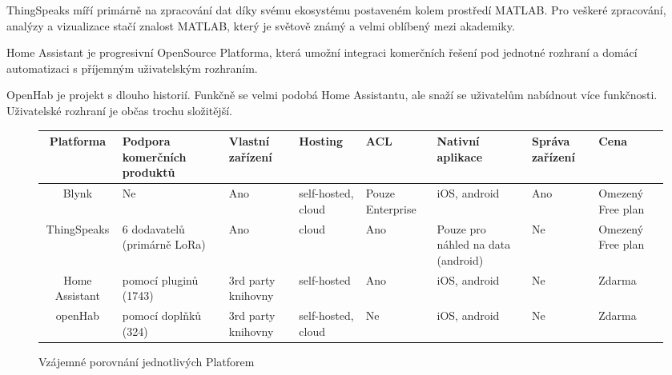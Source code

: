 ThingSpeaks míří primárně na zpracování dat díky svému ekosystému postaveném kolem prostředí MATLAB. Pro veškeré zpracování, analýzy a vizualizace stačí znalost MATLAB, který je světově známý a velmi oblíbený mezi akademiky.

Home Assistant je progresivní OpenSource Platforma, která umožní integraci komerčních řešení pod jednotné rozhraní a domácí automatizaci s příjemným uživatelským rozhraním.

OpenHab je projekt s dlouho historií. Funkčně se velmi podobá Home Assistantu, ale snaží se uživatelům nabídnout více funkčnosti. Uživatelské rozhraní je občas trochu složitější.

\begin{sidewaysfigure}
    \centering
    \begin{tabular}{ |c| m{5em}| m{5em}|m{5em}|m{4em}| m{5em}| m{4em}| m{4em}| }
        \hline
        Platforma      & Podpora komerčních produktů  & Vlastní zařízení   & Hosting            & ACL              & Nativní aplikace                   & Správa zařízení & Cena              \\
        \hline
        Blynk          & Ne                           & Ano                & self-hosted, cloud & Pouze Enterprise & iOS, android                       & Ano             & Omezený Free plan \\
        \hline
        ThingSpeaks    & 6 dodavatelů (primárně LoRa) & Ano                & cloud              & Ano              & Pouze pro náhled na data (android) & Ne              & Omezený Free plan \\
        \hline
        Home Assistant & pomocí pluginů (1743)        & 3rd party knihovny & self-hosted        & Ano              & iOS, android                       & Ne              & Zdarma            \\
        \hline
        openHab        & pomocí doplňků (324)         & 3rd party knihovny & self-hosted, cloud & Ne               & iOS, android                       & Ne              & Zdarma            \\
        \hline
    \end{tabular}
    \caption{Vzájemné porovnání jednotlivých Platforem}\label{compare-table}
\end{sidewaysfigure}

